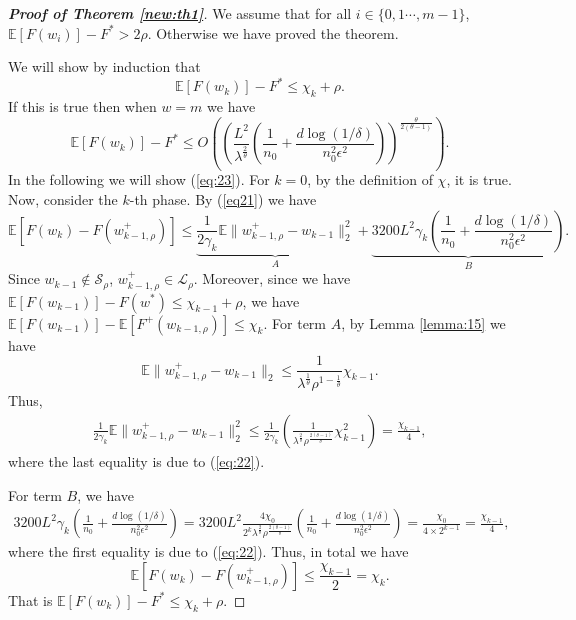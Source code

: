 \documentclass[12pt]{alt2022} %
\begin{document}
\begin{proof}[ {\bf Proof of Theorem \ref{new:th1}}]
     We assume that for all $i\in \{0, 1 \cdots, m-1\}$, $\mathbb{E}[F(w_i)]-F^* > 2\rho$. Otherwise we have proved the theorem. 
     
     
	   We will show by induction that 
	   \begin{equation}\label{eq:23}
	   \mathbb{E}[F(w_k)]-F^*\leq \chi_k+\rho.
	   \end{equation}
	   If this is true then when $w=m$ we have 
	   \begin{equation*}
	      \mathbb{E}[F(w_k)]-F^*\leq O\left(  (\frac{ L^2}{\lambda^\frac{2}{\theta}} (\frac{1}{n_0}+\frac{d\log(1/\delta)}{n_0^2\epsilon^2}))^\frac{\theta}{2(\theta-1)}\right).  
	   \end{equation*}
	   In the following we will show (\ref{eq:23}). For $k=0$, by the definition of $\chi$, it is true. Now, consider the $k$-th phase. By (\ref{eq21}) we have 
	   \begin{equation*}
	       \mathbb{E}[F(w_k)-F(w^+_{k-1, \rho})]\leq \underbrace{\frac{1}{2\gamma_k}\mathbb{E}\|w^+_{k-1, \rho}-w_{k-1}\|_2^2}_{A}+ \underbrace{3200L^2\gamma_k (\frac{1}{n_0}+\frac{d\log(1/\delta)}{n_0^2\epsilon^2 })}_{B}. 
	   \end{equation*}
	   Since $w_{k-1}\not\in \mathcal{S}_\rho$, $w^+_{k-1, \rho} \in \mathcal{L}_\rho$. Moreover, since we have $\mathbb{E} [F(w_{k-1})]-F(w^*)\leq  \chi_{k-1}+\rho$, we have $\mathbb{E} [F(w_{k-1})]-\mathbb{E} [F^+(w_{k-1, \rho})]\leq \chi_k$. For term $A$, by Lemma \ref{lemma:15} we have 
	   \begin{equation*}
	      \mathbb{E} \|w^+_{k-1, \rho}-w_{k-1}\|_2 \leq \frac{1}{\lambda^\frac{1}{\theta}\rho^{1-\frac{1}{\theta}}}\chi_{k-1}.  
	   \end{equation*}
	   Thus, 
	   \begin{align*}
	       \frac{1}{2\gamma_k}\mathbb{E}\|w^+_{k-1, \rho}-w_{k-1}\|_2^2\leq   \frac{1}{2\gamma_k} (\frac{1}{\lambda^\frac{2}{\theta}\rho^{\frac{2(\theta-1)}{\theta}}}\chi^2_{k-1})= \frac{\chi_{k-1}}{4}, 
	   \end{align*}
	  where the last equality is due to (\ref{eq:22}). 
	  
	  For term $B$, we have 
	  \begin{align*}
	    3200L^2\gamma_k (\frac{1}{n_0}+\frac{d\log(1/\delta)}{n_0^2\epsilon^2 })=  3200L^2\frac{4\chi_0}{2^k\lambda^\frac{2}{\theta}\rho^\frac{2(\theta-1)}{\theta} }(\frac{1}{n_0}+\frac{d\log(1/\delta)}{n_0^2\epsilon^2 })=\frac{\chi_0}{4\times 2^{k-1}}=\frac{\chi_{k-1}}{4},
	  \end{align*}
	  where the first equality is due to (\ref{eq:22}). Thus, in total we have 
	  \begin{equation*}
	         \mathbb{E}[F(w_k)-F(w^+_{k-1, \rho})] \leq \frac{\chi_{k-1}}{2}=\chi_k. 
	  \end{equation*}
	  That is $ \mathbb{E}[F(w_k)]-F^* \leq \chi_k+\rho$. 
	\end{proof}
\end{document}
